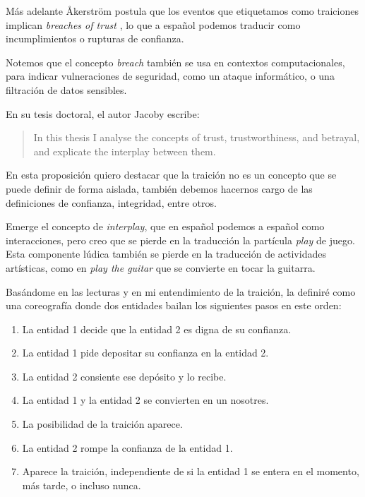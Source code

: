 \documentclass{article}
\begin{document}
Más adelante Åkerström postula que los eventos que etiquetamos como traiciones implican \textit{breaches of trust} \cite[p. 1]{betrayalBetrayersAkerstrom}, lo que a español podemos traducir como incumplimientos o rupturas de confianza.

Notemos que el concepto \textit{breach} también se usa en contextos computacionales, para indicar vulneraciones de seguridad, como un ataque informático, o una filtración de datos sensibles.

En su tesis doctoral, el autor Jacoby escribe:

\begin{quote}
In this thesis I analyse the concepts of trust, trustworthiness, and betrayal, and
explicate the interplay between them. \cite[p. 1]{trustBetrayalJacoby}
\end{quote}

En esta proposición quiero destacar que la traición no es un concepto que se puede definir de forma aislada, también debemos hacernos cargo de las definiciones de confianza, integridad, entre otros.

Emerge el concepto de \textit{interplay}, que en español podemos  a español como interacciones, pero creo que se pierde en la traducción la partícula \textit{play} de juego. Esta componente lúdica también se pierde en la traducción de actividades artísticas, como en \textit{play the guitar} que se convierte en tocar la guitarra.

Basándome en las lecturas y en mi entendimiento de la traición, la definiré como una coreografía donde dos entidades bailan los siguientes pasos en este orden:

\begin{enumerate}
    \item La entidad 1 decide que la entidad 2 es digna de su confianza.
    \item La entidad 1 pide depositar su confianza en la entidad 2.
    \item La entidad 2 consiente ese depósito y lo recibe.
    \item La entidad 1 y la entidad 2 se convierten en un nosotres.
    \item La posibilidad de la traición aparece.
    \item La entidad 2 rompe la confianza de la entidad 1.
    \item Aparece la traición, independiente de si la entidad 1 se entera en el momento, más tarde, o incluso nunca.
\end{enumerate}
\end{document}
